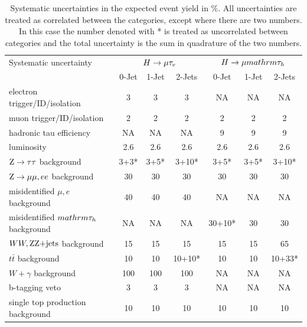 \documentclass[oneside, letterpaper, oldfontcommands]{memoir}
\begin{document}
{{{\begin{table}[t]
 \centering
  \caption{Systematic uncertainties in the expected event yield in \%. All uncertainties are treated as correlated between the categories, except where there are two numbers. In
this case the number denoted with * is treated as uncorrelated between categories and the
total uncertainty is the sum in quadrature of the two numbers.}
  \label{tab:systematics}
{
\begin{tabular}{lccc|ccc} \hline
Systematic  uncertainty                                &  \multicolumn{3}{c|}{$H \rightarrow \mu \mathrm{\tau}_{e}$}& \multicolumn{3}{c}{$H \rightarrow \mu mathrm{\tau_{h}}$}    \\ \cline{2-7}
                                                       &  0-Jet  & 1-Jet  & 2-Jets     &  0-Jet    & 1-Jet     & 2-Jets     \\ \hline
electron trigger/ID/isolation                          &   3   &   3  &   3     &    NA      &   NA       &  NA        \\
muon  trigger/ID/isolation                             &   2   &   2  &   2     &    2    &  2      &  2      \\
hadronic tau efficiency                                &   NA     &   NA    &   NA       &    9    &  9      &  9      \\
luminosity                                             &  2.6  &  2.6 &  2.6    &  2.6    &  2.6    &  2.6    \\
$\mathrm{Z} \rightarrow \mathrm{\tau} \mathrm{\tau}$ background                           &   3+3*&  3+5*&  3+10*  &   3+5*  &   3+5*  &   3+10* \\
$\mathrm{Z} \rightarrow \mu\mu,ee$ background                           &   30  &  30  &  30     &   30    &   30    &   30    \\
misidentified $\mu,e$  background                      &  40   &  40  &  40     &    NA      &   NA       &   NA       \\
misidentified $mathrm{\tau_{h}}$  background                           &  NA      &   NA    &    NA      &   30+10*&  30     &  30     \\
$WW,\mathrm{Z}\mathrm{Z}\text{+jets}$ background                                 &  15   &  15  &   15    &  15     &  15     &  65     \\
$t\bar{t}$ background                         &  10  &  10 &  10+10* &  10    &  10    &  10+33* \\
$W +\gamma$ background                                 &  100  &  100 &  100   &     NA     &    NA      &    NA       \\
b-tagging veto                                         &    3  &   3  &   3     &    NA      &    NA      &    NA       \\
single top production background                       &  10   &  10  &  10    &  10    &  10    &   10    \\ \hline
  \end{tabular}
}


\end{table}}}}
\end{document}
